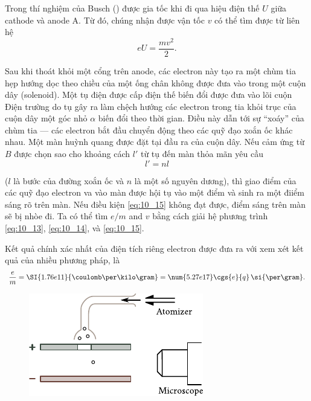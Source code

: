 Trong thí nghiệm của Busch () được gia tốc khi đi qua hiệu điện thế $U$ giữa cathode và anode A.
Từ đó, chúng nhận được vận tốc $v$ có thể tìm được từ liên hệ
\begin{equation}\label{eq:10_14}
    eU = \frac{mv^2}{2}.
\end{equation}

\noindent
Sau khi thoát khỏi một cổng trên anode, các electron này tạo ra một chùm tia hẹp hướng dọc theo chiều của một ống chân không được đưa vào trong một cuộn dây (solenoid).
Một tụ điện được cấp điện thế biến đổi được đưa vào lõi cuộn 
Điện trường do tụ gây ra làm chệch hướng các electron trong tia khỏi trục của cuộn dây một góc nhỏ $\alpha$ biến đổi theo thời gian.
Điều này dẫn tới sự ``xoáy'' của chùm tia --- các electron bắt đầu chuyển động theo các quỹ đạo xoắn ốc khác nhau.
Một màn huỳnh quang được đặt tại đầu ra của cuộn dây.
Nếu cảm ứng từ $B$ được chọn sao cho khoảng cách $l'$ từ tụ đến màn thỏa mãn yêu cầu
\begin{equation}\label{eq:10_15}
    l' = n l
\end{equation}

\noindent
($l$ là bước của đường xoắn ốc và $n$ là một số nguyên dương), thì giao điểm của các quỹ đạo electron va vào màn được hội tụ vào một điểm và sinh ra một điiểm sáng rõ trên màn.
Nếu điều kiện \eqref{eq:10_15} không đạt được, điểm sáng trên màn sẽ bị nhòe đi.
Ta có thể tìm $e/m$ and $v$ bằng cách giải hệ phương trình \eqref{eq:10_13}, \eqref{eq:10_14}, và
\eqref{eq:10_15}.

Kết quả chính xác nhất của điện tích riêng electron được đưa ra với xem xét kết quả của nhiều phương pháp, là
\begin{equation}\label{eq:10_16}
    \frac{e}{m} = \SI{1.76e11}{\coulomb\per\kilo\gram} = \num{5.27e17} \cgs{e}{q}\,\si{\per\gram}.
\end{equation}

\begin{figure}[t]
	\begin{center}
		\includegraphics[scale=1]{figures/ch_10/fig_10_8.pdf}
		\caption[]{}
		\label{fig:10_8}
	\end{center}
	\vspace{-0.8cm}
\end{figure}

